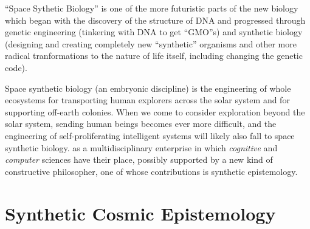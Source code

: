 \documentclass[14pt,titlepage]{extarticle}
\begin{document}
``Space Sythetic Biology'' is one of the more futuristic parts of the new biology which began with the discovery of the structure of DNA and progressed through genetic engineering (tinkering with DNA to get ``GMO''s) and synthetic biology (designing and creating completely new ``synthetic'' organisms and other more radical tranformations to the nature of life itself, including changing the genetic code).

Space synthetic biology (an embryonic discipline) is the engineering of whole ecosystems for transporting human explorers across the solar system and for supporting off-earth colonies.
When we come to consider exploration beyond the solar system, sending human beings becomes ever more difficult, and the engineering of self-proliferating intelligent systems will likely also fall to space synthetic biology.
 as a multidisciplinary enterprise in which \emph{cognitive} and \emph{computer} sciences have their place, possibly supported by a new kind of constructive philosopher, one of whose contributions is synthetic epistemology.


\section{Synthetic Cosmic Epistemology}





%
%






\end{document}
